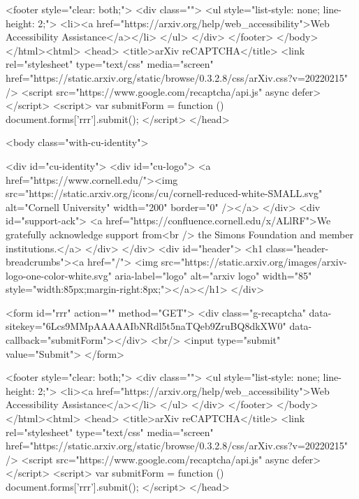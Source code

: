        <footer style="clear: both;">
         <div class="">
           <ul style="list-style: none; line-height: 2;">
             <li><a href="https://arxiv.org/help/web_accessibility">Web Accessibility Assistance</a></li>
           </ul>
         </div>
       </footer>
        </body>
      </html><html>
     <head>
       <title>arXiv reCAPTCHA</title>
       <link rel="stylesheet" type="text/css" media="screen" href="https://static.arxiv.org/static/browse/0.3.2.8/css/arXiv.css?v=20220215" />
       <script src="https://www.google.com/recaptcha/api.js" async defer></script>
       <script>
         var submitForm = function () {
             document.forms['rrr'].submit();
         }
       </script>
     </head>

     <body class="with-cu-identity">

       <div id="cu-identity">
         <div id="cu-logo">
           <a href="https://www.cornell.edu/"><img src="https://static.arxiv.org/icons/cu/cornell-reduced-white-SMALL.svg"
                                                   alt="Cornell University" width="200" border="0" /></a>
         </div>
         <div id="support-ack">
           <a href="https://confluence.cornell.edu/x/ALlRF">We gratefully acknowledge support from<br />
             the Simons Foundation and member institutions.</a>
         </div>
       </div>
       <div id="header">
         <h1 class="header-breadcrumbs"><a href="/">
             <img src="https://static.arxiv.org/images/arxiv-logo-one-color-white.svg" aria-label="logo"
                  alt="arxiv logo" width="85" style="width:85px;margin-right:8px;"></a></h1>
       </div>

       <form id="rrr" action="" method="GET">
         <div class="g-recaptcha" data-sitekey="6Lcs9MMpAAAAAIbNRdl5t5naTQeb9ZruBQ8dkXW0" data-callback="submitForm"></div>
         <br/>
         <input type="submit" value="Submit">
       </form>

       <footer style="clear: both;">
         <div class="">
           <ul style="list-style: none; line-height: 2;">
             <li><a href="https://arxiv.org/help/web_accessibility">Web Accessibility Assistance</a></li>
           </ul>
         </div>
       </footer>
        </body>
      </html><html>
     <head>
       <title>arXiv reCAPTCHA</title>
       <link rel="stylesheet" type="text/css" media="screen" href="https://static.arxiv.org/static/browse/0.3.2.8/css/arXiv.css?v=20220215" />
       <script src="https://www.google.com/recaptcha/api.js" async defer></script>
       <script>
         var submitForm = function () {
             document.forms['rrr'].submit();
         }
       </script>
     </head>

